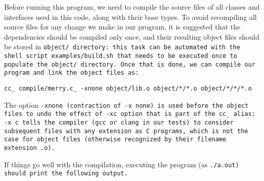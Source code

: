 Before running this program, we need to compile the source files of all
classes and interfaces used in this code, along with their base types.
To avoid recompiling all source files for any change we make in our program,
it is suggested that the dependencies should be compiled only once,
and their resulting object files should be stored in \tt{object/} directory:
this task can be automated with the shell script \tt{examples/build.sh}
that needs to be executed once to populate the \tt{object/} directory.
Once that is done, we can compile our program and link the object files as:

\begin{center}

\tt{cc_ compile/merry.c_ -xnone object/lib.o object/*/*.o object/*/*/*.o}

\end{center}

The option \tt{-xnone} (contraction of \tt{-x none}) is used before the object
files to undo the effect of \tt{-xc} option that is part of the \tt{cc_} alias:
\tt{-x c} tells the compiler (\tt{gcc} or \tt{clang} in our tests) to consider
subsequent files with any extension as \tt{C} programs, which is not the case
for object files (otherwise recognized by their filename extension \tt{.o}).

If things go well with the compilation,
executing the program (as \tt{./a.out}) should print the following output.

